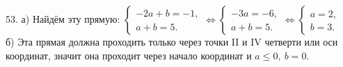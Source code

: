 53. а) Найдём эту прямую: $\begin{cases} -2a+b=-1,\\ a+b=5.\end{cases}\Leftrightarrow\begin{cases} -3a=-6,\\ a+b=5.\end{cases}\Leftrightarrow
\begin{cases} a=2,\\ b=3.\end{cases}$\\
б) Эта прямая должна проходить только через точки II и IV четверти или оси координат, значит она проходит через начало координат и $a\leqslant0,\ b=0.$\\
